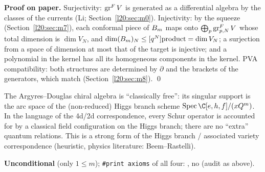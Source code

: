 \textbf{Proof on paper.} Surjectivity: $\operatorname{gr}^F V$ is generated as a differential algebra by the classes of the
currents (Li; Section~\ref{l20:sec:m0}). Injectivity: by the squeeze (Section~\ref{l20:sec:m7}), each conformal
piece of $B_m$ maps onto $\bigoplus_p\operatorname{gr}^F_{p,N}V$ whose total dimension is $\dim V_N$, and
$\dim(B_m)_N\le[q^N]\mathrm{product}=\dim V_N$; a surjection from a space of dimension at most that of
the target is injective; and a polynomial in the kernel has all its homogeneous components in the kernel. PVA
compatibility: both structures are determined by $\partial$ and the brackets of the generators, which match
(Section~\ref{l20:sec:m8}). \qed

\begin{physics}
The Argyres--Douglas chiral algebra is ``classically free'': its singular support is the arc space of the
(non-reduced) Higgs branch scheme $\operatorname{Spec}\C[e,h,f]/(x\ltwentyQ^m)$. In the language of the
4d/2d correspondence, every Schur operator is accounted for by a classical field configuration on the Higgs
branch; there are no ``extra'' quantum relations. This is a strong form of the Higgs branch / associated
variety correspondence (heuristic, physics literature: Beem--Rastelli).
\end{physics}

\begin{status}
\textbf{Unconditional} (only $1\le m$); \texttt{\#print axioms} of all four:
, no  (audit as above).
\end{status}

